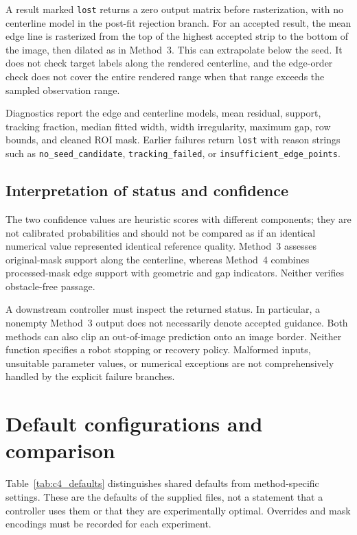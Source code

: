 A result marked \texttt{lost} returns a zero output matrix before
rasterization, with no centerline model in the post-fit rejection branch.
For an accepted result, the mean edge line is rasterized from the top of
the highest accepted strip to the bottom of the image, then dilated as
in Method~3. This can extrapolate below the seed. It does not check target
labels along the rendered centerline, and the edge-order check does not
cover the entire rendered range when that range exceeds the sampled
observation range.

Diagnostics report the edge and centerline models, mean residual,
support, tracking fraction, median fitted width, width irregularity,
maximum gap, row bounds, and cleaned ROI mask. Earlier failures return
\texttt{lost} with reason strings such as \texttt{no\_seed\_candidate},
\texttt{tracking\_failed}, or \texttt{insufficient\_edge\_points}.

\subsection{Interpretation of status and confidence}
\label{subsec:c4_failures}

The two confidence values are heuristic scores with different components;
they are not calibrated probabilities and should not be compared as if
an identical numerical value represented identical reference quality.
Method~3 assesses original-mask support along the centerline, whereas
Method~4 combines processed-mask edge support with geometric and gap
indicators. Neither verifies obstacle-free passage.

A downstream controller must inspect the returned status. In particular,
a nonempty Method~3 output does not necessarily denote accepted guidance.
Both methods can also clip an out-of-image prediction onto an image
border. Neither function specifies a robot stopping or recovery policy.
Malformed inputs, unsuitable parameter values, or numerical exceptions
are not comprehensively handled by the explicit failure branches.

\section{Default configurations and comparison}
\label{sec:c4_discussion}

Table~\ref{tab:c4_defaults} distinguishes shared defaults from
method-specific settings. These are the defaults of the supplied files,
not a statement that a controller uses them or that they are
experimentally optimal. Overrides and mask encodings must be recorded
for each experiment.

